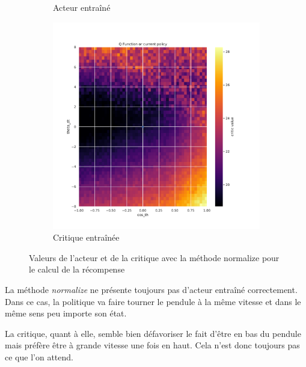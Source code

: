 \begin{figure}[H]
\begin{subfigure}{0.3\textwidth}
        \caption{Acteur entraîné}
    \end{subfigure}
    \begin{subfigure}{0.3\textwidth}
        \includegraphics[width=\textwidth]{figures/iteration3/0_critic_normalize_post_Pendulum-v0.pdf}
        \caption{Critique entraînée}
    \end{subfigure}
    \caption{Valeurs de l'acteur et de la critique avec la méthode normalize pour le calcul de la récompense}
    \label{fig:itr3_normalize}
\end{figure}

La méthode \emph{normalize} ne présente toujours pas d'acteur entraîné correctement. Dans ce cas, la politique va faire tourner le pendule à la même vitesse et dans le même sens peu importe son état.

La critique, quant à elle, semble bien défavoriser le fait d'être en bas du pendule mais préfère être à grande vitesse une fois en haut. Cela n'est donc toujours pas ce que l'on attend.